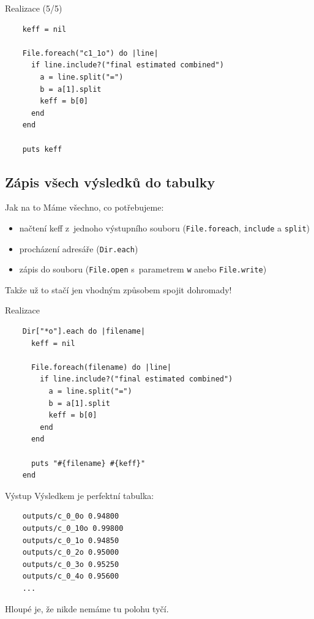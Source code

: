 \documentclass{beamer}
\begin{document}
\begin{frame}[fragile]{Realizace (5/5)}
  \scriptsize
  \begin{verbatim}
    keff = nil

    File.foreach("c1_1o") do |line|
      if line.include?("final estimated combined")
        a = line.split("=")
        b = a[1].split
        keff = b[0]
      end
    end

    puts keff
  \end{verbatim}
\end{frame}

\subsection{Zápis všech výsledků do tabulky}

\begin{frame}{Jak na to}
  Máme všechno, co potřebujeme:
  \begin{itemize}
    \item načtení keff z~jednoho výstupního souboru (\texttt{File.foreach}, \texttt{include} a \texttt{split})
    \item procházení adresáře (\texttt{Dir.each})
    \item zápis do souboru (\texttt{File.open} s~parametrem \texttt{w} anebo \texttt{File.write})
  \end{itemize}
  Takže už to stačí jen vhodným způsobem spojit dohromady!
\end{frame}

\begin{frame}[fragile]{Realizace}
  \scriptsize
  \begin{verbatim}
    Dir["*o"].each do |filename|
      keff = nil

      File.foreach(filename) do |line|
        if line.include?("final estimated combined")
          a = line.split("=")
          b = a[1].split
          keff = b[0]
        end
      end

      puts "#{filename} #{keff}"
    end
  \end{verbatim}
\end{frame}

\begin{frame}[fragile]{Výstup}
  Výsledkem je perfektní tabulka:
  {\scriptsize
  \begin{verbatim}
    outputs/c_0_0o 0.94800
    outputs/c_0_10o 0.99800
    outputs/c_0_1o 0.94850
    outputs/c_0_2o 0.95000
    outputs/c_0_3o 0.95250
    outputs/c_0_4o 0.95600
    ...
  \end{verbatim}}
  Hloupé je, že nikde nemáme tu polohu tyčí.
\end{frame}
\end{document}
